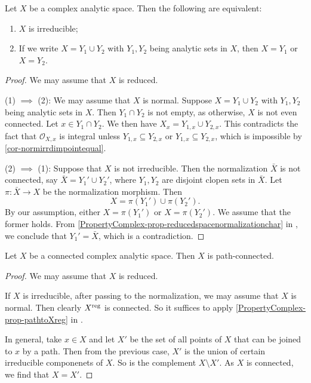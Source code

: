 \begin{corollary}\label{cor-irreduciblesetschar}
    Let $X$ be a complex analytic space. Then the following are equivalent:
    \begin{enumerate}
        \item $X$ is irreducible;
        \item If we write $X=Y_1\cup Y_2$ with $Y_1,Y_2$ being analytic sets in $X$, then $X=Y_1$ or $X=Y_2$.
    \end{enumerate}
\end{corollary}
\begin{proof}
    We may assume that $X$ is reduced.

    (1) $\implies$ (2): We may assume that $X$ is normal.
    Suppose $X=Y_1\cup Y_2$ with $Y_1,Y_2$ being analytic sets in $X$. Then $Y_1\cap Y_2$ is not empty, as otherwise, $X$ is not even connected. Let $x\in Y_1\cap Y_2$. We then have $X_x=Y_{1,x}\cup Y_{2,x}$. This contradicts the fact that $\mathcal{O}_{X,x}$ is integral unless $Y_{1,x}\subseteq Y_{2,x}$ or $Y_{1,x}\subseteq Y_{2,x}$, which is impossible by \cref{cor-normirrdimpointequal}.

    (2) $\implies$ (1): Suppose that $X$ is not irreducible. Then the normalization $\bar{X}$ is not connected, say $\bar{X}=Y_1'\cup Y_2'$, where $Y_1,Y_2$ are disjoint clopen sets in $\bar{X}$. Let $\pi:\bar{X}\rightarrow X$ be the normalization morphism. Then
    \[
        X=\pi(Y_1')\cup \pi(Y_2').  
    \]
    By our assumption, either  $X=\pi(Y_1')$ or $X=\pi(Y_2')$. We assume that the former holds. From \cref{PropertyComplex-prop-reducedspacenormalizationchar} in , we conclude that $Y_1'=\bar{X}$, which is a contradiction.
\end{proof}


\begin{corollary}
    Let $X$ be a connected complex analytic space. Then $X$ is path-connected.
\end{corollary}
\begin{proof}
    We may assume that $X$ is reduced.

    If $X$ is irreducible, after passing to the normalization, we may assume that $X$ is normal. Then clearly $X^{\operatorname{reg}}$ is connected. So it suffices to apply \cref{PropertyComplex-prop-pathtoXreg} in .

    In general, take $x\in X$ and let $X'$ be the set of all points of $X$ that can be joined to $x$ by a path. Then from the previous case, $X'$ is the union of certain irreducible componenets of $X$. So is the complement $X\setminus X'$. As $X$ is connected, we find that $X=X'$.
\end{proof}


